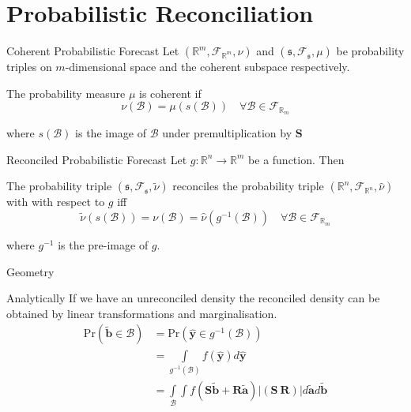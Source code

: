 \documentclass{beamer}
\begin{document}
  \section{Probabilistic Reconciliation}
  \begin{frame}{Coherent Probabilistic Forecast}
    Let $(\mathbb{R}^m,\mathcal{F}_{\mathbb{R}^m},\nu)$ and $(\mathfrak{s},\mathcal{F}_{\mathfrak{s}},\mu)$ be probability triples on $m$-dimensional space and the coherent subspace respectively.
    \begin{definition}
      The probability measure $\mu$ is coherent if
      \begin{equation*}
      \nu(\mathcal{B})=\mu(s(\mathcal{B}))\quad\forall\mathcal{B}\in \mathcal{F}_{\mathbb{R}_m}
      \end{equation*} 
    \end{definition}
    where $s(\mathcal{B})$ is the image of $\mathcal{B}$ under premultiplication by ${\bm S}$
  \end{frame}
  \begin{frame}{Reconciled Probabilistic Forecast}
  	Let $g:\mathbb{R}^n\rightarrow\mathbb{R}^m$ be a function.  Then 
  	\begin{definition}
  	The probability triple $\left(\mathfrak{s},\mathcal{F}_{\mathfrak{s}},\tilde{\nu}\right)$ reconciles the probability triple $\left(\mathbb{R}^n,\mathcal{F}_{\mathbb{R}^n},\hat{\nu}\right)$ with with respect to $g$ iff
  	\begin{equation*}
  	\tilde{\nu}(s(\mathcal{B}))=\nu(\mathcal{B})=\hat{\nu}(g^{-1}(\mathcal{B}))\quad\forall \mathcal{B}\in\mathcal{F}_{\mathbb{R}_m}
  	\end{equation*}
  	\end{definition}
    where $g^{-1}$ is the pre-image of $g$.
  \end{frame}
  \begin{frame}{Geometry}
  	\centering
  	
  \end{frame}
  \begin{frame}{Analytically}
  	If we have an unreconciled density the reconciled density can be obtained by linear transformations and marginalisation.
  	\begin{align*}
  	\mbox{Pr}(\tilde{\bm{b}}\in \mathcal{B})&=\mbox{Pr}(\hat{\bm{y}}\in g^{-1}(\mathcal{B}))\\
  	&=\int\limits_{g^{-1}(\mathcal{B})}f(\hat{\bm{y}})d\hat{\bm{y}}\\
  	&=\int\limits_{\mathcal{B}}\int f(\bm{S}\tilde{\bm{b}}+\bm{R}\tilde{\bm{a}})|\left(\bm{S}~\bm{R}\right)|d\tilde{\bm{a}}d\tilde{\bm{b}}
  	\end{align*}
  \end{frame}
\end{document}
